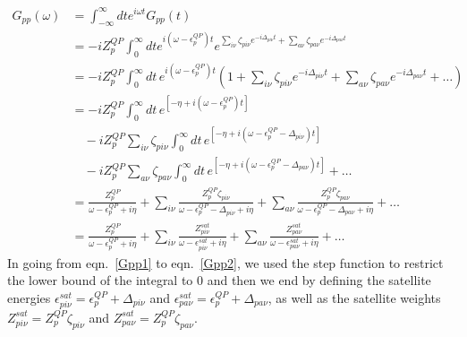 \begin{align}
G_{pp}(\omega) & = \int_{-\infty}^{\infty} dt e^{i \omega t} G_{pp}(t)
\label{Gpp1}
\\
& = -i Z_p^{QP} \int_0^{\infty} dt e^{i(\omega - \epsilon_p^{QP}) t} e^{\sum_{i\nu} \zeta_{pi\nu} e^{-i\Delta_{pi\nu} t} + \sum_{a\nu} \zeta_{pa\nu} e^{-i\Delta_{pa\nu} t}} 
\label{Gpp2}
\\
& = -i Z_p^{QP} \int_0^{\infty} dt\, e^{i(\omega - \epsilon_p^{QP}) t} \left(1 + \sum_{i\nu} \zeta_{pi\nu} e^{-i\Delta_{pi\nu} t} + \sum_{a\nu} \zeta_{pa\nu} e^{-i\Delta_{pa\nu} t} + \ldots \right) \\
&= -i Z_p^{QP} \int_0^{\infty} dt\, e^{[-\eta + i(\omega - \epsilon_p^{QP}) t]}\label{Gpp3} \\
&\quad - i Z_p^{QP} \sum_{i\nu} \zeta_{pi\nu} \int_0^{\infty} dt\, e^{[-\eta + i(\omega - \epsilon_p^{QP} - \Delta_{pi\nu}) t]} \\
&\quad - i Z_p^{QP} \sum_{a\nu} \zeta_{pa\nu} \int_0^{\infty} dt\, e^{[-\eta + i(\omega - \epsilon_p^{QP} - \Delta_{pa\nu}) t]} + \ldots \\
&= \frac{Z_p^{QP}}{\omega - \epsilon_p^{QP} + i\eta} + \sum_{i\nu} \frac{Z_p^{QP} \zeta_{pi\nu}}{\omega - \epsilon_p^{QP} - \Delta_{pi\nu} + i\eta} + \sum_{a\nu} \frac{Z_p^{QP} \zeta_{pa\nu}}{\omega - \epsilon_p^{QP} - \Delta_{pa\nu} + i\eta} + \ldots\\
& = \frac{Z_p^{QP}}{\omega - \epsilon_p^{QP} + i\eta} + \sum_{i\nu} \frac{Z_{pi\nu}^{sat}}{\omega - \epsilon_{pi\nu}^{sat} + i\eta} + \sum_{a\nu} \frac{Z_{pa\nu}^{sat}}{\omega - \epsilon_{pa\nu}^{sat} + i\eta} + \ldots
\end{align}
In going from eqn.~\ref{Gpp1} to eqn.~\ref{Gpp2}, we used the step function to restrict the lower bound of the integral to $0$ and then we end by defining the satellite energies $\epsilon_{pi\nu}^{sat} = \epsilon_p^{QP} + \Delta_{pi\nu}$ and $\epsilon_{pa\nu}^{sat} = \epsilon_p^{QP} + \Delta_{pa\nu}$, as well as the satellite weights $Z_{pi\nu}^{sat} = Z_p^{QP} \zeta_{pi\nu}$ and $Z_{pa\nu}^{sat} = Z_p^{QP} \zeta_{pa\nu}$. 
